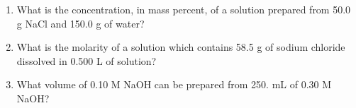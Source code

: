 \documentclass[main.tex]{subfiles}
\begin{document}
\begin{fullwidth}
\begin{multicols}{2}
\begin{enumerate}[resume]


\item What is the concentration, in mass percent, of a solution prepared from 50.0 g NaCl and 150.0 g of water? 
\begin{enumerate}[label=(\alph*)]\vspace{-0.5cm}
\end{enumerate}\vspace{-0.5cm}


\item What is the molarity of a solution which contains 58.5 g of sodium chloride dissolved in 0.500 L of solution?
\begin{enumerate}[label=(\alph*)]\vspace{-0.5cm}
\end{enumerate}\vspace{-0.5cm}

\item What volume of 0.10 M NaOH can be prepared from 250. mL of 0.30 M NaOH?
\begin{enumerate}[label=(\alph*)]\vspace{-0.5cm}
\end{enumerate}\vspace{-0.5cm}


\end{enumerate}
\end{multicols}
\end{fullwidth}
\end{document}

